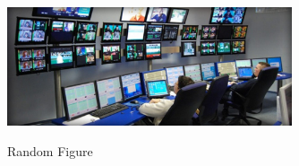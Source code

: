 \begin{figure}[ht]
  \centering
  \caption[Random Figure]{Random Figure}
  \includegraphics[width=0.75\textwidth]{figures/monitoring.pdf}
  \label{fig:random_figure}
\end{figure}